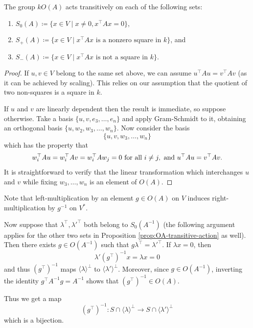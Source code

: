 \begin{prop}\label{prop:OA-transitive-action}
	The group $kO(A)$ acts transitively on each of the following sets:
	\begin{enumerate}
		\item $S_0(A) \coloneqq \{x \in V \mid x\neq 0, x^\top A x = 0\}$,
		\item $S_+(A) \coloneqq \{ x\in V \mid x^\top A x \text{ is a nonzero square in } k\}$, and
		\item $S_-(A) \coloneqq \{ x\in V \mid x^\top A x \text{ is not a square in } k\}$.
	\end{enumerate}
\end{prop}
\begin{proof}
	If $u,v\in V$ belong to the same set above, we can assume $u^\top A u = v^\top A v$ (as it can be achieved by scaling). This relies on our assumption that the quotient of two non-squares is a square in $k$.
	
	If $u$ and $v$ are linearly dependent then the result is immediate, so suppose otherwise. Take a basis $\{u,v,e_3,\ldots,e_n\}$ and apply Gram-Schmidt to it, obtaining an orthogonal basis $\{u, w_2, w_3, \ldots,w_n\}$. Now consider the basis
	\[
		\{u,v,w_3,\ldots,w_n\}
	\]
	which has the property that
	\[
		w_i^\top A u = w_i^\top A v = w_i^\top A w_j = 0 \text{ for all } i \neq j, \text{ and }\\
		u^\top A u = v^\top A v.
	\]
	It is straightforward to verify that the linear transformation which interchanges $u$ and $v$ while fixing $w_3,\ldots,w_n$ is an element of $O(A)$.
\end{proof}

Note that left-multiplication by an element $g \in O(A)$ on $V$ induces right-multiplication by $g^{-1}$ on $V^*$.

Now suppose that $\lambda^\top,\lambda'^\top$ both belong to $S_0(A^{-1})$ (the following argument applies for the other two sets in Proposition \ref{prop:OA-transitive-action} as well). Then there exists $g \in O(A^{-1})$ such that $g \lambda^\top = \lambda'^\top$. If $\lambda x = 0$, then
\[
	\lambda' (g^\top)^{-1} x = \lambda x = 0
\]
and thus $(g^\top)^{-1}$ maps $\langle \lambda \rangle^\bot$ to $\langle \lambda' \rangle^\bot$. Moreover, since $g \in O(A^{-1})$, inverting the identity $g^\top A^{-1} g = A^{-1}$ shows that $(g^\top)^{-1} \in O(A)$.

Thus we get a map
\[
	(g^\top)^{-1} \colon S \cap \langle \lambda \rangle^\bot \to S \cap \langle \lambda' \rangle^\bot
\]
which is a bijection.

